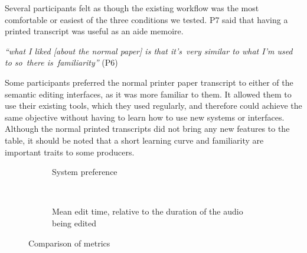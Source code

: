 Several participants felt as though the existing workflow was the most comfortable or easiest of the three conditions
we tested. P7 said that having a printed transcript was useful as an aide memoire.

\textit{``what I liked [about the normal paper] is that it's very similar to what I'm used to so there is familiarity''}
(P6)

Some participants preferred the normal printer paper transcript to either of the semantic editing interfaces, as it was
more familiar to them. It allowed them to use their existing tools, which they used regularly, and therefore could
achieve the same objective without having to learn how to use new systems or interfaces. Although the normal printed
transcripts did not bring any new features to the table, it should be noted that a short learning curve and familiarity
are important traits to some producers.

\begin{figure}[p]
  \begin{subfigure}[b]{0.5\textwidth}
    \centering
    \label{fig:preference}
    \caption{System preference}
  \end{subfigure}
  ~
  \begin{subfigure}[b]{0.5\textwidth}
    \centering
    \label{fig:paperspeed}
    \caption{Mean edit time, relative to the duration of the audio being edited}
  \end{subfigure}
  \caption{Comparison of metrics}
\end{figure}

